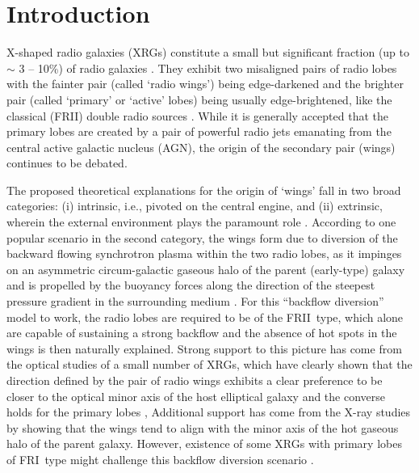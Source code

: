 \documentclass[twocolumn]{aastex62}
\def\frii{FR{II}~}
\def\fri{FR{I}}
\begin{document}
\section{Introduction}
\label{sec:intro_xrg}
 X-shaped radio galaxies (XRGs) constitute a small but significant
 fraction (up to $\sim$ 3 -- 10\%) of radio galaxies
 \citep{Leahy1984MNRAS.210..929L,Leahy1992ersf.meet..307L,Yang2019arXiv190506356Y}. They
 exhibit two misaligned pairs of radio lobes with the fainter pair
 (called `radio wings') being edge-darkened and the brighter pair
 (called `primary' or `active' lobes) being usually edge-brightened,
 like the classical (FRII) double radio sources
 \citep{Leahy1984MNRAS.210..929L,Capetti2017A&A...601A..81C}. While it
 is generally accepted that the primary lobes are created by a pair of
 powerful radio jets emanating from the central active galactic
 nucleus (AGN), the origin of the secondary pair (wings) continues to
 be debated. \par
The proposed theoretical explanations for the origin of `wings' fall
in two broad categories: (i) intrinsic, i.e., pivoted on the central
engine, and (ii) extrinsic, wherein the external environment plays the
paramount role \citep[see,][for a review]{Gopal2010ApJ...720L.155G}.
According to one popular scenario in the second category, the wings
form due to diversion of the backward flowing synchrotron plasma
within the two radio lobes, as it impinges on an asymmetric
circum-galactic gaseous halo of the parent (early-type) galaxy and is
propelled by the buoyancy forces along the direction of the steepest
pressure gradient in the surrounding medium
\citep{Leahy1984MNRAS.210..929L,Worrall1995ApJ...449...93W,Kraft2005ApJ...622..149K,
  Capetti2002A&A...394...39C,Hodges2010ApJ...717L..37H,Rossi2017A&A...606A..57R}.
For this ``backflow diversion'' model to work, the radio lobes are
required to be of the \frii type, which alone are capable of
sustaining a strong backflow and the absence of hot spots in the wings
is then naturally explained. Strong support to this picture has come
from the optical studies of a small number of XRGs, which have clearly
shown that the direction defined by the pair of radio wings exhibits a
clear preference to be closer to the optical minor axis of the host
elliptical galaxy and the converse holds for the primary lobes
\citep{Capetti2002A&A...394...39C,Saripalli2009ApJ...695..156S,Gillone2016A&A...587A..25G},
Additional support has come from the X-ray studies by
\citet{Hodges2010ApJ...710.1205H} showing that the wings tend to align
with the minor axis of the hot gaseous halo of the parent galaxy.
However, existence of some XRGs with primary lobes of \fri\ type might
challenge this backflow diversion scenario \citep[but
  see,][]{Saripalli2009ApJ...695..156S}.
\end{document}
